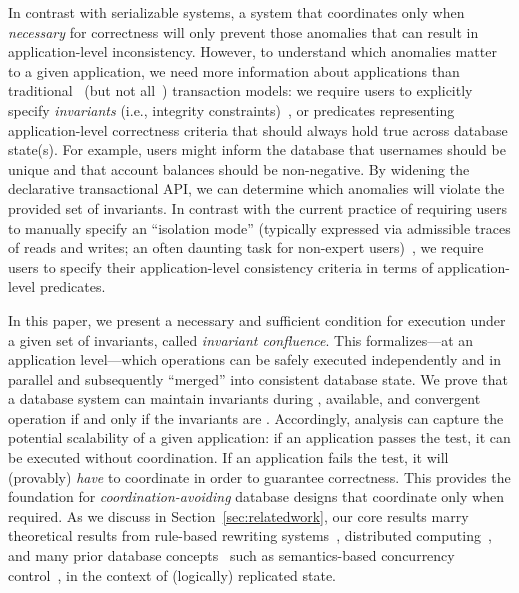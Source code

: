 
In contrast with serializable systems, a system that coordinates only
when \textit{necessary} for correctness will only prevent those
anomalies that can result in application-level inconsistency. However,
to understand which anomalies matter to a given application, we need
more information about applications than
traditional~\cite{bernstein-book,gray-virtues} (but not
all~\cite{eswaran-consistency,korth-serializability,decomp-semantics,garciamolina-semantics,activedb-book,ic-survey,ic-survey-two})
transaction models: we require users to explicitly specify
\textit{invariants} (i.e., integrity constraints)~\cite{traiger-tods},
or predicates representing application-level correctness criteria that
should always hold true across database state(s). For example, users
might inform the database that usernames should be unique and that
account balances should be non-negative. By widening the declarative
transactional API, we can determine which anomalies will violate the
provided set of invariants. In contrast with the current practice of
requiring users to manually specify an ``isolation mode'' (typically
expressed via admissible traces of reads and writes; an often daunting
task for non-expert users)~\cite{consistency-borders}, we require
users to specify their application-level consistency criteria in terms
of application-level predicates.



In this paper, we present a necessary and sufficient condition for
\cfree execution under a given set of invariants, called
\textit{invariant confluence}. This \iconfluence formalizes---at an
application level---which operations can be safely executed
independently and in parallel and subsequently ``merged'' into
consistent database state. We prove that a database system can
maintain invariants during \cfree, available, and convergent operation
if and only if the invariants are \iconfluent. Accordingly,
\iconfluence analysis can capture the potential scalability of a given
application: if an application passes the \iconfluence test, it can be
executed without coordination. If an application fails the test, it
will (provably) \textit{have} to coordinate in order to guarantee
correctness. This provides the foundation for
\textit{coordination-avoiding} database designs that coordinate only
when required. As we discuss in Section~\ref{sec:relatedwork}, our
core results marry theoretical results from rule-based rewriting
systems~\cite{obs-confluence,termrewriting}, distributed
computing~\cite{herlihy-apologizing,gilbert-cap,hat-vldb}, and many
prior database concepts~\cite{activedb-book,ic-survey,ic-survey-two}
such as semantics-based concurrency
control~\cite{sdd1,decomp-semantics,badrinath-semantics,garciamolina-semantics,korth-serializability,atomictransactions,weihl-thesis},
in the context of (logically) replicated state.


